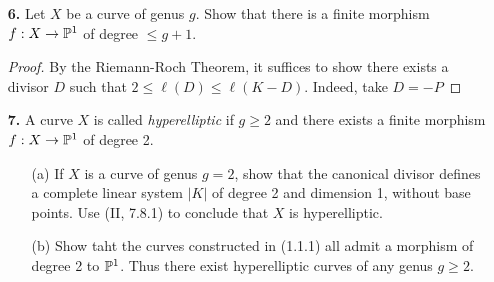 \documentclass{article}
\begin{document}
\begin{enumerate} [label=\textbf{\arabic*.}, leftmargin=0em]
\item[\textbf{6.}] Let $X$ be a curve of genus $g$.
Show that there is a finite morphism $f : X \to \mathbb{P}^1$ of degree $\leq g + 1$.

\begin{proof}
  By the Riemann-Roch Theorem, it suffices to show there exists a divisor $D$ such that $2 \leq \ell(D) \leq \ell(K - D)$.
  Indeed, take $D = -P$
\end{proof}

\item[\textbf{7.}] A curve $X$ is called \textit{hyperelliptic} if $g \geq 2$ and there exists a finite morphism $f : X \to \mathbb{P}^1$ of degree 2.
\begin{itemize}
  \item[(a)] If $X$ is a curve of genus $g = 2$, show that the canonical divisor defines a complete linear system $|K|$ of degree 2 and dimension 1, without base points. Use (II, 7.8.1) to conclude that $X$ is hyperelliptic.
  \item[(b)] Show taht the curves constructed in (1.1.1) all admit a morphism of degree 2 to $\mathbb{P}^1$. Thus there exist hyperelliptic curves of any genus $g \geq 2$.
\end{itemize}

\end{enumerate}
\end{document}
